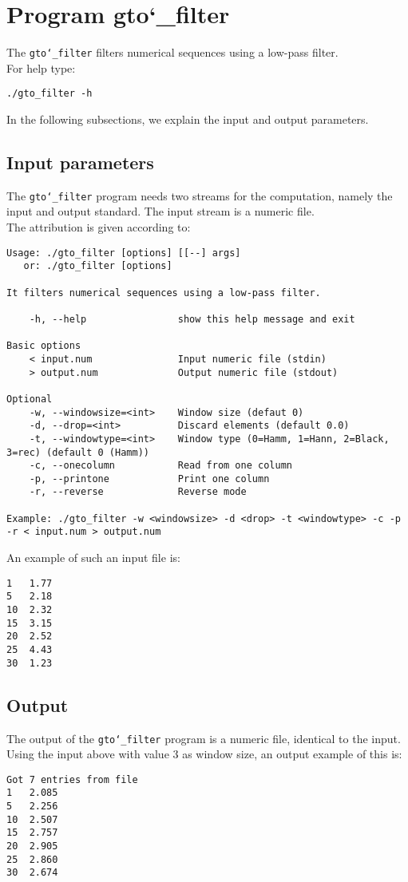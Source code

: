 \section{Program gto\char`_filter}
The \texttt{gto\char`_filter} filters numerical sequences using a low-pass filter.\\
For help type:
\begin{lstlisting}
./gto_filter -h
\end{lstlisting}
In the following subsections, we explain the input and output parameters.

\subsection*{Input parameters}

The \texttt{gto\char`_filter} program needs two streams for the computation, namely the input and output standard. The input stream is a numeric file.\\
The attribution is given according to:
\begin{lstlisting}
Usage: ./gto_filter [options] [[--] args]
   or: ./gto_filter [options]

It filters numerical sequences using a low-pass filter.

    -h, --help                show this help message and exit

Basic options
    < input.num               Input numeric file (stdin)
    > output.num              Output numeric file (stdout)

Optional
    -w, --windowsize=<int>    Window size (defaut 0)
    -d, --drop=<int>          Discard elements (default 0.0)
    -t, --windowtype=<int>    Window type (0=Hamm, 1=Hann, 2=Black, 3=rec) (default 0 (Hamm))
    -c, --onecolumn           Read from one column
    -p, --printone            Print one column
    -r, --reverse             Reverse mode

Example: ./gto_filter -w <windowsize> -d <drop> -t <windowtype> -c -p -r < input.num > output.num
\end{lstlisting}
An example of such an input file is:
\begin{lstlisting}
1   1.77
5   2.18
10  2.32
15  3.15
20  2.52
25  4.43
30  1.23
\end{lstlisting}

\subsection*{Output}
The output of the \texttt{gto\char`_filter} program is a numeric file, identical to the input.\\
Using the input above with value 3 as window size, an output example of this is:
\begin{lstlisting}
Got 7 entries from file
1   2.085
5   2.256
10  2.507
15  2.757
20  2.905
25  2.860
30  2.674
\end{lstlisting}